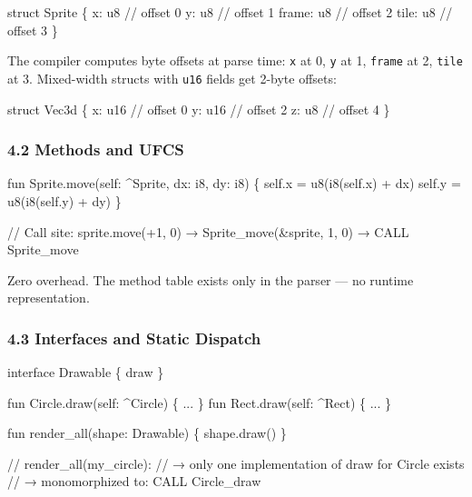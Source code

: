 \documentclass[
  11pt,
]{article}
\newenvironment{Shaded}{\begin{snugshade}}{\end{snugshade}}
\newcommand{\NormalTok}[1]{#1}
\begin{document}
\begin{Shaded}
\begin{Highlighting}[]
\NormalTok{struct Sprite \{}
\NormalTok{    x: u8       // offset 0}
\NormalTok{    y: u8       // offset 1}
\NormalTok{    frame: u8   // offset 2}
\NormalTok{    tile: u8    // offset 3}
\NormalTok{\}}
\end{Highlighting}
\end{Shaded}

The compiler computes byte offsets at parse time: \texttt{x} at 0,
\texttt{y} at 1, \texttt{frame} at 2, \texttt{tile} at 3. Mixed-width
structs with \texttt{u16} fields get 2-byte offsets:

\begin{Shaded}
\begin{Highlighting}[]
\NormalTok{struct Vec3d \{}
\NormalTok{    x: u16   // offset 0}
\NormalTok{    y: u16   // offset 2}
\NormalTok{    z: u8    // offset 4}
\NormalTok{\}}
\end{Highlighting}
\end{Shaded}

\hypertarget{methods-and-ufcs}{%
\subsubsection{4.2 Methods and UFCS}\label{methods-and-ufcs}}

\begin{Shaded}
\begin{Highlighting}[]
\NormalTok{fun Sprite.move(self: \^{}Sprite, dx: i8, dy: i8) \{}
\NormalTok{    self.x = u8(i8(self.x) + dx)}
\NormalTok{    self.y = u8(i8(self.y) + dy)}
\NormalTok{\}}

\NormalTok{// Call site:}
\NormalTok{sprite.move(+1, 0)   →   Sprite\_move(\&sprite, 1, 0)   →   CALL Sprite\_move}
\end{Highlighting}
\end{Shaded}

Zero overhead. The method table exists only in the parser --- no runtime
representation.

\hypertarget{interfaces-and-static-dispatch}{%
\subsubsection{4.3 Interfaces and Static
Dispatch}\label{interfaces-and-static-dispatch}}

\begin{Shaded}
\begin{Highlighting}[]
\NormalTok{interface Drawable \{}
\NormalTok{    draw}
\NormalTok{\}}

\NormalTok{fun Circle.draw(self: \^{}Circle) \{ ... \}}
\NormalTok{fun Rect.draw(self: \^{}Rect) \{ ... \}}

\NormalTok{fun render\_all(shape: Drawable) \{}
\NormalTok{    shape.draw()}
\NormalTok{\}}

\NormalTok{// render\_all(my\_circle):}
\NormalTok{//   → only one implementation of \textquotesingle{}draw\textquotesingle{} for Circle exists}
\NormalTok{//   → monomorphized to: CALL Circle\_draw}
\end{Highlighting}
\end{Shaded}
\end{document}
